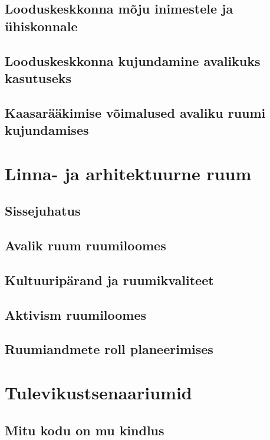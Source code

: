 \documentclass[]{book}
\begin{document}
\hypertarget{loodus_3.3}{%
\section{Looduskeskkonna mõju inimestele ja ühiskonnale}\label{loodus_3.3}}

\hypertarget{loodus_3.4}{%
\section{Looduskeskkonna kujundamine avalikuks kasutuseks}\label{loodus_3.4}}

\hypertarget{loodus_3.5}{%
\section{Kaasarääkimise võimalused avaliku ruumi kujundamises}\label{loodus_3.5}}

\hypertarget{chapter4}{%
\chapter{Linna- ja arhitektuurne ruum}\label{chapter4}}

\hypertarget{sissejuhatus-4}{%
\section*{Sissejuhatus}\label{sissejuhatus-4}}

\hypertarget{linna_4.2}{%
\section{Avalik ruum ruumiloomes}\label{linna_4.2}}

\hypertarget{linna_4.3}{%
\section{Kultuuripärand ja ruumikvaliteet}\label{linna_4.3}}

\hypertarget{linna_4.4}{%
\section{Aktivism ruumiloomes}\label{linna_4.4}}

\hypertarget{linna_4.5}{%
\section{Ruumiandmete roll planeerimises}\label{linna_4.5}}

\hypertarget{chapter5}{%
\chapter{Tulevikustsenaariumid}\label{chapter5}}

\hypertarget{tuleviku_5.1}{%
\section{Mitu kodu on mu kindlus}\label{tuleviku_5.1}}


\end{document}
